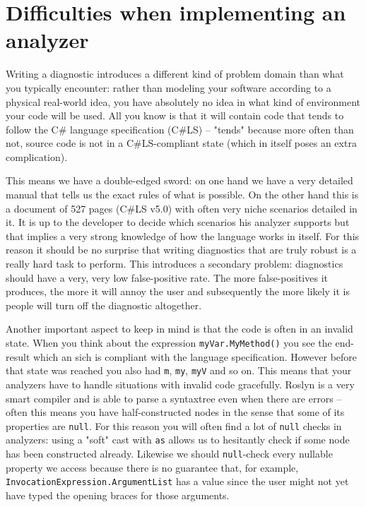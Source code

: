 \newpage

\section{Difficulties when implementing an analyzer}
\label{sec:diagnostic-difficulties}

Writing a diagnostic introduces a different kind of problem domain than what you typically encounter: rather than modeling your software according to a physical real-world idea, you have absolutely no idea in what kind of environment your code will be used. All you know is that it will contain code that tends to follow the C\# language specification (C\#LS) -- "tends" because more often than not, source code is not in a C\#LS-compliant state (which in itself poses an extra complication). 

This means we have a double-edged sword: on one hand we have a very detailed manual that tells us the exact rules of what is possible. On the other hand this is a document of 527 pages (C\#LS v5.0) with often very niche scenarios detailed in it. It is up to the developer to decide which scenarios his analyzer supports but that implies a very strong knowledge of how the language works in itself. For this reason it should be no surprise that writing diagnostics that are truly robust is a really hard task to perform. This introduces a secondary problem: diagnostics should have a very, very low false-positive rate. The more false-positives it produces, the more it will annoy the user and subsequently the more likely it is people will turn off the diagnostic altogether.

Another important aspect to keep in mind is that the code is often in an invalid state. When you think about the expression \texttt{myVar.MyMethod()} you see the end-result which an sich is compliant with the language specification. However before that state was reached you also had \texttt{m}, \texttt{my}, \texttt{myV} and so on. This means that your analyzers have to handle situations with invalid code gracefully. Roslyn is a very smart compiler and is able to parse a \gls{syntaxtree} even when there are errors -- often this means you have half-constructed nodes in the sense that some of its properties are \texttt{null}. For this reason you will often find a lot of \texttt{null} checks in analyzers: using a "soft" cast with \texttt{as} allows us to hesitantly check if some node has been constructed already. Likewise we should \texttt{null}-check every nullable property we access because there is no guarantee that, for example, \texttt{InvocationExpression.ArgumentList} has a value since the user might not yet have typed the opening braces for those arguments.

